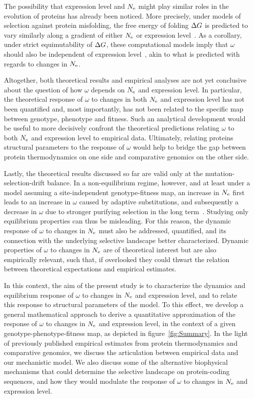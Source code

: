 \documentclass{article}
\begin{document}
The possibility that expression level and $N_{\text{e}}$ might play similar roles in the evolution of proteins has already been noticed.
More precisely, under models of selection against protein misfolding, the free energy of folding $\Delta G$ is predicted to vary similarly along a gradient of either $N_{\text{e}}$ or expression level~\citep{Serohijos2013}.
As a corollary, under strict equimutability of $\Delta G$, these computational models imply that $\omega$ should also be independent of expression level~\citep{Serohijos2012}, akin to what is predicted with regards to changes in $N_{\text{e}}$.

Altogether, both theoretical results and empirical analyses are not yet conclusive about the question of how $\omega$ depends on $N_{\text{e}}$ and expression level.
In particular, the theoretical response of $\omega$ to changes in both $N_{\text{e}}$ and expression level has not been quantified and, most importantly, has not been related to the specific map between genotype, {phenotype} and fitness.
Such an analytical development would be useful to more decisively confront the theoretical predictions relating $\omega$ to both $N_{\text{e}}$ and expression level to empirical data.
Ultimately, relating proteins structural parameters to the response of $\omega$ would help to bridge the gap between protein thermodynamics on one side and comparative genomics on the other side.

Lastly, the theoretical results discussed so far are valid only at the mutation-selection-drift balance.
In a non-equilibrium regime, however, and at least under a model assuming a site-independent genotype-fitness map, an increase in $N_{\text{e}}$ first leads to an increase in $\omega$ caused by adaptive {substitutions}, and subsequently a decrease in $\omega$ due to stronger purifying selection in the long term~\citep{Jones2016}.
Studying only equilibrium properties can thus be misleading.
For this reason, the dynamic response of $\omega$ to changes in $N_{\text{e}}$ must also be addressed, quantified, and its connection with the underlying selective landscape better characterized.
Dynamic properties of $\omega$ to changes in $N_{\text{e}}$ are of theoretical interest but are also empirically relevant, such that, if overlooked they could thwart the relation between theoretical expectations and empirical estimates.

In this context, the aim of the present study is to characterize the dynamics and equilibrium response of $\omega$ to changes in $N_{\text{e}}$ and expression level, and to relate this response to structural parameters of the model.
To this effect, we develop a general mathematical approach to derive a quantitative approximation of the response of $\omega$ to changes in $N_{\text{e}}$ and expression level, in the context of a given genotype-phenotype-fitness map, as depicted in figure~\ref{fig:Summary}.
In the light of previously published empirical estimates from protein thermodynamics and comparative genomics, we discuss the articulation between empirical data and our mechanistic model.
We also discuss some of the alternative biophysical mechanisms that could determine the selective landscape on protein-coding sequences, and how they would modulate the response of $\omega$ to changes in $N_{\text{e}}$ and expression level.
\end{document}
